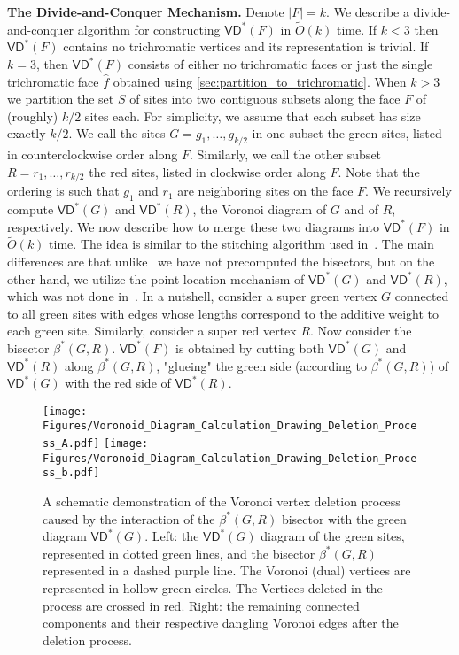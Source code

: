 \documentclass{article}
\newcommand{\VD}{\textsf{VD}}
\newcommand{\Otild}{\tilde{O}}
\begin{document}
\medskip
\noindent
{\bf The Divide-and-Conquer Mechanism.}
Denote $|F| = k$.
We describe a divide-and-conquer algorithm for constructing $\VD^*(F)$ in $\Otild(k)$ time.
 If $k < 3$ then $\VD^*(F)$ contains no trichromatic vertices and its representation is trivial.
If $k = 3$, then $\VD^*(F)$ consists of either no trichromatic faces or just the single trichromatic face $\hat f$ obtained using \cref{sec:partition_to_trichromatic}.
When $k>3$ we partition the set $S$ of sites into two contiguous subsets along the face $F$ of (roughly) $k/2$ sites each.
For simplicity, we assume that each subset has size exactly $k/2$.
We call the sites $G = g_1, \dots, g_{k/2}$ in one subset the green sites, listed in counterclockwise order along $F$.
Similarly, we call the other subset $R = r_1, \dots, r_{k/2}$ the red sites, listed in clockwise order along $F$.
Note that the ordering is such that $g_1$ and $r_1$ are neighboring sites on the face  $F$.
We recursively compute $\VD^*(G)$ and $\VD^*(R)$, the Voronoi diagram of $G$ and of $R$, respectively.
We now describe how to merge these two diagrams into $\VD^*(F)$ in $\Otild(k)$ time.
The idea is similar to the stitching algorithm used in~\cite{DBLP:journals/siamcomp/GawrychowskiKMS21}. The main differences are that unlike~\cite{DBLP:journals/siamcomp/GawrychowskiKMS21} we have not precomputed the bisectors, but on the other hand, we utilize the point location mechanism of $\VD^*(G)$ and $\VD^*(R)$, which was not done in~\cite{DBLP:journals/siamcomp/GawrychowskiKMS21}.
In a nutshell, consider a super green vertex $G$ connected to all green sites with edges whose lengths correspond to the additive weight to each green site. Similarly, consider a super red vertex $R$.
Now consider the bisector $\beta^*(G,R)$.
$\VD^*(F)$ is obtained by cutting both $\VD^*(G)$ and $\VD^*(R)$ along $\beta^*(G,R)$, "glueing" the green side (according to $\beta^*(G,R)$) of $\VD^*(G)$ with the red side of $\VD^*(R)$.

\begin{figure}[htb]
     \centering
     \texttt{[image: Figures/Voronoid\_Diagram\_Calculation\_Drawing\_Deletion\_Process\_A.pdf]}
     \hspace{0.5in}\texttt{[image: Figures/Voronoid\_Diagram\_Calculation\_Drawing\_Deletion\_Process\_b.pdf]}
     \caption{A schematic demonstration of the Voronoi vertex deletion process caused by the interaction of the $\beta^*(G,R)$ bisector with the green diagram $\VD^*(G)$. Left: the $\VD^*(G)$ diagram of the green sites, represented in dotted green lines, and the bisector $\beta^*(G,R)$ represented in a dashed purple line. The Voronoi (dual) vertices are represented in hollow green circles. The Vertices deleted in the process are crossed in red. Right: the remaining connected components and their respective dangling Voronoi edges after the deletion process.}
     \label{fig:Voronoid_Diagram_Calculation_Drawing_Deletion_Process}
 \end{figure}
\end{document}
